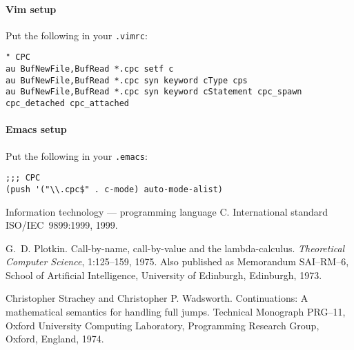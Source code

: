 \documentclass[a4paper]{report}
\begin{document}
\paragraph{Vim setup} Put the following in your {\tt .vimrc}:
\begin{verbatim}
" CPC
au BufNewFile,BufRead *.cpc setf c
au BufNewFile,BufRead *.cpc syn keyword cType cps
au BufNewFile,BufRead *.cpc syn keyword cStatement cpc_spawn cpc_detached cpc_attached
\end{verbatim}

\paragraph{Emacs setup} Put the following in your {\tt .emacs}:
\begin{verbatim}
;;; CPC
(push '("\\.cpc$" . c-mode) auto-mode-alist)
\end{verbatim}

\begin{thebibliography}{MTHM90}

Information technology --- programming language {C}.
International standard ISO/IEC~9899:1999, 1999.

G.~D. Plotkin.
Call-by-name, call-by-value and the lambda-calculus.
{\em Theoretical Computer Science}, 1:125--159, 1975.
Also published as Memorandum SAI--RM--6, School of Artificial
  Intelligence, University of Edinburgh, Edinburgh, 1973.

Christopher Strachey and Christopher P. Wadsworth.
Continuations: A mathematical semantics for handling full jumps.
Technical Monograph PRG--11, Oxford University Computing
Laboratory, Programming Research Group, Oxford, England, 1974.

\end{thebibliography}
\end{document}
